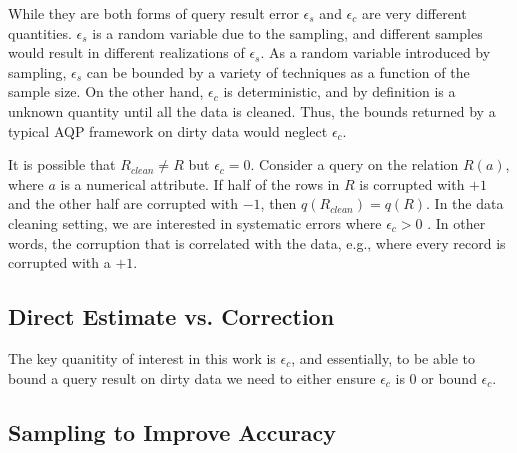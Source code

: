 While they are both forms of query result error $\epsilon_s$ and $\epsilon_c$ are very different quantities.
$\epsilon_s$ is a random variable due to the sampling, and different samples would result in different realizations of $\epsilon_s$.
As a random variable introduced by sampling, $\epsilon_s$ can be bounded by a variety of techniques as a function of the sample size.
On the other hand, $\epsilon_c$ is deterministic, and by definition is a unknown quantity until all the data is cleaned.
Thus, the bounds returned by a typical AQP framework on dirty data would neglect $\epsilon_c$.

It is possible that $R_{clean} \ne R$ but $\epsilon_c=0$.
Consider a \sumfunc query on the relation $R(a)$, where $a$ is a numerical attribute.
If half of the rows in $R$ is corrupted with $+1$ and the other half are corrupted with $-1$, then $q(R_{clean}) = q(R)$.
In the data cleaning setting, we are interested in systematic errors where $\epsilon_c > 0$ \cite{taylor1982introduction}. 
In other words, the corruption that is correlated with the data, e.g., where every record is corrupted with a $+1$.

\subsection{Direct Estimate vs. Correction}
The key quanitity of interest in this work is $\epsilon_c$, and essentially, to be able to bound
a query result on dirty data we need to either ensure $\epsilon_c$ is 0 or bound $\epsilon_c$.


\subsection{Sampling to Improve Accuracy}